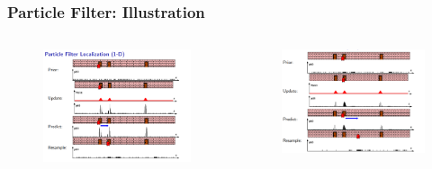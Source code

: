 \documentclass{beamer}
\begin{document}
\begin{frame}
\frametitle{Particle Filter: Illustration}
\begin{columns}[c] 
\begin{figure}
\includegraphics[width=1.0\linewidth]{PF_eg.png}
\end{figure}
\begin{figure}
\includegraphics[width=1.0\linewidth]{PF_eg2.png}
\end{figure}
\end{columns}
\end{frame}
\end{document}
